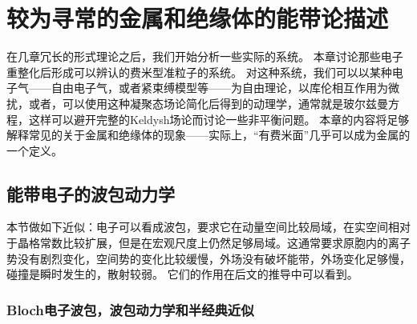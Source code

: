 \chapter{较为寻常的金属和绝缘体的能带论描述}\label{chap:conventional-metal}

在几章冗长的形式理论之后，我们开始分析一些实际的系统。
本章讨论那些电子重整化后形成可以辨认的费米型准粒子的系统。
对这种系统，我们可以以某种电子气——自由电子气，或者紧束缚模型等——为自由理论，以库伦相互作用为微扰，或者，可以使用这种凝聚态场论简化后得到的动理学，通常就是玻尔兹曼方程，这样可以避开完整的Keldysh场论而讨论一些非平衡问题。
本章的内容将足够解释常见的关于金属和绝缘体的现象——实际上，“有费米面”几乎可以成为金属的一个定义。

\section{能带电子的波包动力学}

本节做如下近似：电子可以看成波包，要求它在动量空间比较局域，在实空间相对于晶格常数比较扩展，但是在宏观尺度上仍然足够局域。这通常要求原胞内的离子势没有剧烈变化，空间势的变化比较缓慢，外场没有破坏能带，外场变化足够慢，碰撞是瞬时发生的，散射较弱。 
它们的作用在后文的推导中可以看到。

\subsection{Bloch电子波包，波包动力学和半经典近似}\label{sec:bloch-wave-pocket}

